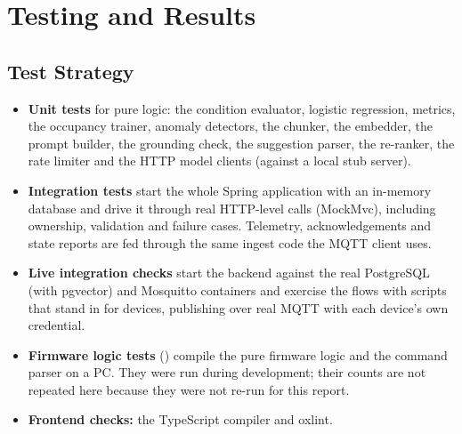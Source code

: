 \documentclass[12pt,a4paper,oneside]{report}
\newcommand{\code}[1]{\texttt{\detokenize{#1}}}
\begin{document}
\chapter{Testing and Results}
\label{ch:testing}

\begin{center}
\end{center}

\section{Test Strategy}
\begin{itemize}
  \item \textbf{Unit tests} for pure logic: the condition evaluator, logistic regression, metrics, the occupancy trainer, anomaly detectors, the chunker, the embedder, the prompt builder, the grounding check, the suggestion parser, the re-ranker, the rate limiter and the HTTP model clients (against a local stub server).
  \item \textbf{Integration tests} start the whole Spring application with an in-memory database and drive it through real HTTP-level calls (MockMvc), including ownership, validation and failure cases. Telemetry, acknowledgements and state reports are fed through the same ingest code the MQTT client uses.
  \item \textbf{Live integration checks} start the backend against the real PostgreSQL (with pgvector) and Mosquitto containers and exercise the flows with scripts that stand in for devices, publishing over real MQTT with each device's own credential.
  \item \textbf{Firmware logic tests} (\code{firmware/tests}) compile the pure firmware logic and the command parser on a PC. They were run during development; their counts are not repeated here because they were not re-run for this report.
  \item \textbf{Frontend checks:} the TypeScript compiler and oxlint.
\end{itemize}
\end{document}
